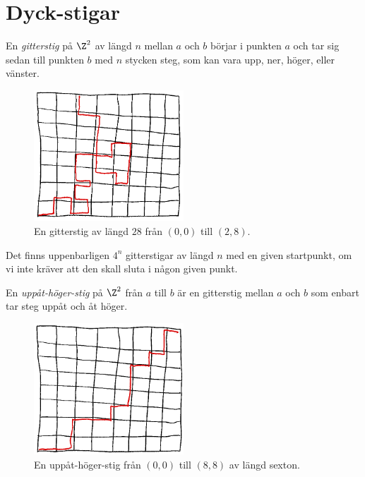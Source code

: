 \documentclass[nobib]{tufte-handout}
\begin{document}
\section{Dyck-stigar}

\begin{definition}
    En \emph{gitterstig} på $\Z^2$ av längd $n$ mellan $a$ och $b$ börjar i punkten $a$ och tar sig sedan till punkten $b$ med $n$ stycken steg, som kan vara upp, ner, höger, eller vänster.
    \begin{figure}
        \centering
        \includegraphics[width=0.5\textwidth]{graphics/general_lattice_path.png}
        \caption{En gitterstig av längd $28$ från $(0,0)$ till $(2,8)$.}
    \end{figure} 
\end{definition}

Det finns uppenbarligen $4^n$ gitterstigar av längd $n$ med en given startpunkt, om vi inte kräver att den skall sluta i någon given punkt.

\begin{definition}
    En \emph{uppåt-höger-stig} på $\Z^2$ från $a$ till $b$ är en gitterstig mellan $a$ och $b$ som enbart tar steg uppåt och åt höger.
    \begin{figure}[h]
        \centering
        \includegraphics[width=0.5\textwidth]{graphics/right_up_lattice_path.png}
        \caption{En uppåt-höger-stig från $(0,0)$ till $(8,8)$ av längd sexton.}
    \end{figure}
\end{definition}
\end{document}

